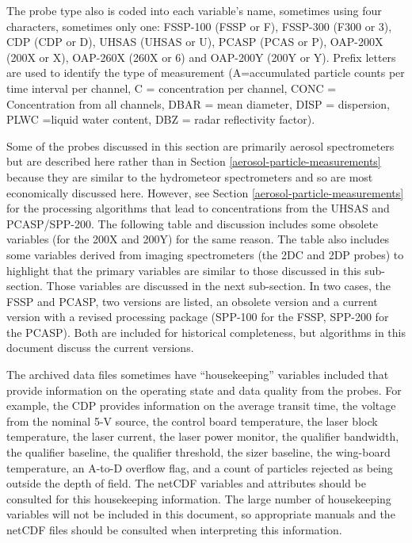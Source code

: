 \documentclass[
]{book}
\begin{document}
The probe type also is coded into each variable's name, sometimes using four characters, sometimes only one: FSSP-100 (FSSP or F), FSSP-300 (F300 or 3), CDP (CDP or D), UHSAS (UHSAS or U), PCASP (PCAS or P), OAP-200X (200X or X), OAP-260X (260X or 6) and OAP-200Y (200Y or Y). Prefix letters are used to identify the type of measurement (A=accumulated particle counts per time interval per channel, C = concentration per channel, CONC = Concentration from all channels, DBAR = mean diameter, DISP = dispersion, PLWC =liquid water content, DBZ = radar reflectivity factor).

Some of the probes discussed in this section are primarily aerosol spectrometers but are described here rather than in Section \ref{aerosol-particle-measurements} because they are similar to the hydrometeor spectrometers and so are most economically discussed here. However, see Section \ref{aerosol-particle-measurements} for the processing algorithms that lead to concentrations from the UHSAS and PCASP/SPP-200. The following table and discussion includes some obsolete variables (for the 200X and 200Y) for the same reason. The table also includes some variables derived from imaging spectrometers (the 2DC and 2DP probes) to highlight that the primary variables are similar to those discussed in this sub-section. Those variables are discussed in the next sub-section. In two cases, the FSSP and PCASP, two versions are listed, an obsolete version and a current version with a revised processing package (SPP-100 for the FSSP, SPP-200 for the PCASP). Both are included for historical completeness, but algorithms in this document discuss the current versions.

The archived data files sometimes have ``housekeeping'' variables included that provide information on the operating state and data quality from the probes. For example, the CDP provides information on the average transit time, the voltage from the nominal 5-V source, the control board temperature, the laser block temperature, the laser current, the laser power monitor, the qualifier bandwidth, the qualifier baseline, the qualifier threshold, the sizer baseline, the wing-board temperature, an A-to-D overflow flag, and a count of particles rejected as being outside the depth of field. The netCDF variables and attributes should be consulted for this housekeeping information. The large number of housekeeping variables will not be included in this document, so appropriate manuals and the netCDF files should be consulted when interpreting this information.
\end{document}
